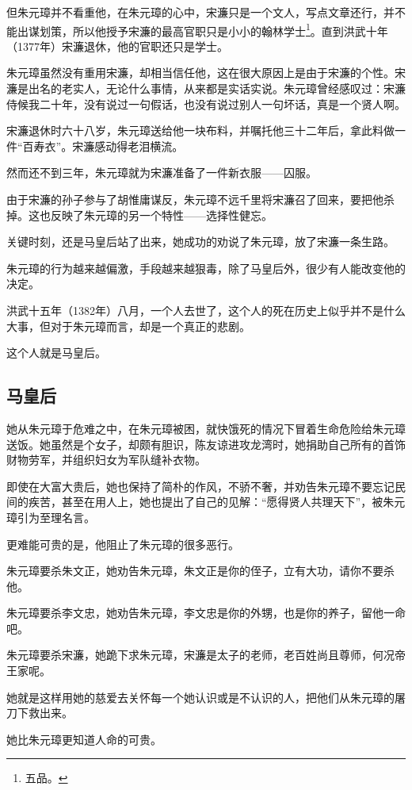 \begin{multicols}{\theparacolNo}
		但朱元璋并不看重他，在朱元璋的心中，宋濂只是一个文人，写点文章还行，并不能出谋划策，所以他授予宋濂的最高官职只是小小的翰林学士\footnote{五品。}。直到洪武十年（1377年）宋濂退休，他的官职还只是学士。

		朱元璋虽然没有重用宋濂，却相当信任他，这在很大原因上是由于宋濂的个性。宋濂是出名的老实人，无论什么事情，从来都是实话实说。朱元璋曾经感叹过：宋濂侍候我二十年，没有说过一句假话，也没有说过别人一句坏话，真是一个贤人啊。

		宋濂退休时六十八岁，朱元璋送给他一块布料，并嘱托他三十二年后，拿此料做一件“百寿衣”。宋濂感动得老泪横流。

		然而还不到三年，朱元璋就为宋濂准备了一件新衣服——囚服。

		由于宋濂的孙子参与了胡惟庸谋反，朱元璋不远千里将宋濂召了回来，要把他杀掉。这也反映了朱元璋的另一个特性——选择性健忘。

		关键时刻，还是马皇后站了出来，她成功的劝说了朱元璋，放了宋濂一条生路。

		朱元璋的行为越来越偏激，手段越来越狠毒，除了马皇后外，很少有人能改变他的决定。

		洪武十五年（1382年）八月，一个人去世了，这个人的死在历史上似乎并不是什么大事，但对于朱元璋而言，却是一个真正的悲剧。

		这个人就是马皇后。

		\subsection{马皇后}
		她从朱元璋于危难之中，在朱元璋被困，就快饿死的情况下冒着生命危险给朱元璋送饭。她虽然是个女子，却颇有胆识，陈友谅进攻龙湾时，她捐助自己所有的首饰财物劳军，并组织妇女为军队缝补衣物。

		即使在大富大贵后，她也保持了简朴的作风，不骄不奢，并劝告朱元璋不要忘记民间的疾苦，甚至在用人上，她也提出了自己的见解：“愿得贤人共理天下”，被朱元璋引为至理名言。

		更难能可贵的是，他阻止了朱元璋的很多恶行。

		朱元璋要杀朱文正，她劝告朱元璋，朱文正是你的侄子，立有大功，请你不要杀他。

		朱元璋要杀李文忠，她劝告朱元璋，李文忠是你的外甥，也是你的养子，留他一命吧。

		朱元璋要杀宋濂，她跪下求朱元璋，宋濂是太子的老师，老百姓尚且尊师，何况帝王家呢。

		她就是这样用她的慈爱去关怀每一个她认识或是不认识的人，把他们从朱元璋的屠刀下救出来。

		她比朱元璋更知道人命的可贵。


\end{multicols}

